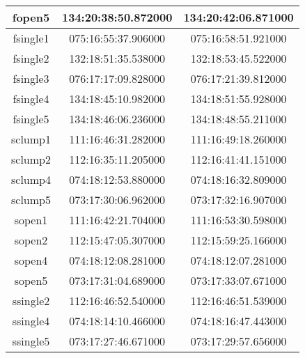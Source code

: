 \documentclass{article}
\begin{document}
\begin{table}
\begin{center}
\begin{tabular}{ |c| c| c| }
\hline
fopen5 & 134:20:38:50.872000 & 134:20:42:06.871000 \\
\hline
fsingle1 & 075:16:55:37.906000 & 075:16:58:51.921000 \\
\hline
fsingle2 & 132:18:51:35.538000 & 132:18:53:45.522000 \\
\hline
fsingle3 & 076:17:17:09.828000 & 076:17:21:39.812000 \\
\hline
fsingle4 & 134:18:45:10.982000 & 134:18:51:55.928000 \\
\hline
fsingle5 & 134:18:46:06.236000 & 134:18:48:55.211000 \\
\hline
sclump1 & 111:16:46:31.282000 & 111:16:49:18.260000 \\
\hline
sclump2 & 112:16:35:11.205000 & 112:16:41:41.151000 \\
\hline
sclump4 & 074:18:12:53.880000 & 074:18:16:32.809000 \\
\hline
sclump5 & 073:17:30:06.962000 & 073:17:32:16.907000 \\
\hline
sopen1 & 111:16:42:21.704000 & 111:16:53:30.598000 \\
\hline
sopen2 & 112:15:47:05.307000 & 112:15:59:25.166000 \\
\hline
sopen4 & 074:18:12:08.281000 & 074:18:12:07.281000 \\
\hline
sopen5 & 073:17:31:04.689000 & 073:17:33:07.671000 \\
\hline
ssingle2 & 112:16:46:52.540000 & 112:16:46:51.539000 \\
\hline
ssingle4 & 074:18:14:10.466000 & 074:18:16:47.443000 \\
\hline
ssingle5 & 073:17:27:46.671000 & 073:17:29:57.656000 \\
\hline
\end{tabular}
\end{center}

\end{table}
\end{document}
